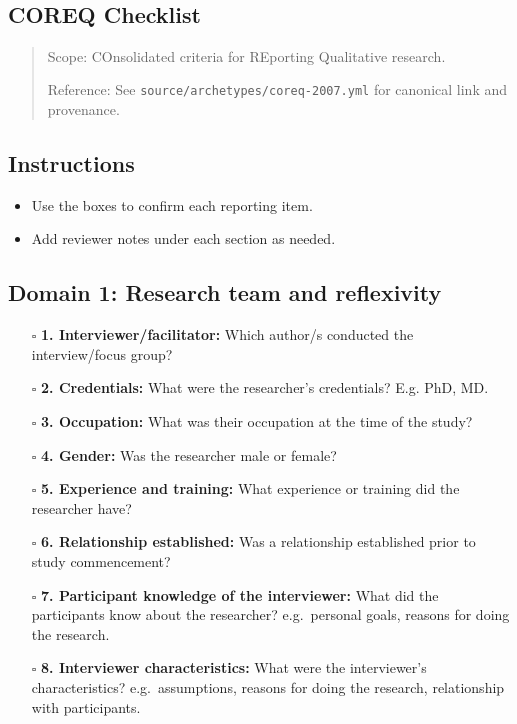 \documentclass[11pt]{article}
\def\tightlist{}
\begin{document}
\begin{center}
{\LARGE }\\[4pt]
\normalsize 
\end{center}
\vspace{1em}

\begin{Form}

\section{COREQ Checklist}\label{coreq-checklist}

\begin{quote}
Scope: COnsolidated criteria for REporting Qualitative research.

Reference: See \texttt{source/archetypes/coreq-2007.yml} for canonical
link and provenance.
\end{quote}

\subsection{Instructions}\label{instructions}

\begin{itemize}
\tightlist
\item
  Use the boxes to confirm each reporting item.
\item
  Add reviewer notes under each section as needed.
\end{itemize}

\subsection{Domain 1: Research team and
reflexivity}\label{domain-1-research-team-and-reflexivity}

\begin{itemize}
\tightlist
\item[$\square$]
  \textbf{1. Interviewer/facilitator:} Which author/s conducted the
  interview/focus group?
\item[$\square$]
  \textbf{2. Credentials:} What were the researcher's credentials? E.g.
  PhD, MD.
\item[$\square$]
  \textbf{3. Occupation:} What was their occupation at the time of the
  study?
\item[$\square$]
  \textbf{4. Gender:} Was the researcher male or female?
\item[$\square$]
  \textbf{5. Experience and training:} What experience or training did
  the researcher have?
\item[$\square$]
  \textbf{6. Relationship established:} Was a relationship established
  prior to study commencement?
\item[$\square$]
  \textbf{7. Participant knowledge of the interviewer:} What did the
  participants know about the researcher? e.g.~personal goals, reasons
  for doing the research.
\item[$\square$]
  \textbf{8. Interviewer characteristics:} What were the interviewer's
  characteristics? e.g.~assumptions, reasons for doing the research,
  relationship with participants.
\end{itemize}


\end{Form}
\end{document}
